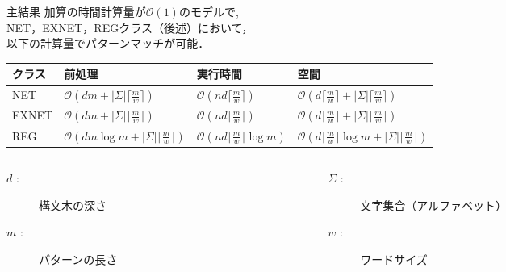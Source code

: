 \documentclass[dvipdfmx,12pt,beamer]{standalone}
\begin{document}
\begin{frame}{主結果}
  加算の時間計算量が$\mathcal{O}\left( 1 \right)$のモデルで, \\ 
  \textsf{NET}，\textsf{EXNET}，\textsf{REG}クラス（後述）において，\\以下の計算量でパターンマッチが可能．
  \begin{center}
    \scriptsize
    \begin{tabular}{|l|l|l|l|}\hline
      クラス & 前処理 & 実行時間 & 空間 \\\hline
      \textsf{NET} & $\mathcal{O}\left(dm + |\Sigma|\lceil \frac{m}{w} \rceil \right)$ & $\mathcal{O}\left(nd\lceil \frac{m}{w} \rceil \right)$ & $\mathcal{O}\left(d\lceil \frac{m}{w} \rceil + |\Sigma|\lceil \frac{m}{w} \rceil \right)$ \\\hline
      \textsf{EXNET} & $\mathcal{O}\left(dm + |\Sigma|\lceil \frac{m}{w} \rceil \right)$ & $\mathcal{O}\left(nd\lceil \frac{m}{w} \rceil \right)$ & $\mathcal{O}\left(d\lceil \frac{m}{w} \rceil + |\Sigma|\lceil \frac{m}{w} \rceil \right)$ \\\hline
      \textsf{REG} & $\mathcal{O}\left(dm\log m + |\Sigma|\lceil \frac{m}{w} \rceil \right)$ & $\mathcal{O}\left(nd\lceil \frac{m}{w} \rceil \log m \right)$ & $\mathcal{O}\left(d\lceil \frac{m}{w} \rceil \log m + |\Sigma|\lceil \frac{m}{w} \rceil \right)$ \\\hline
    \end{tabular}
  \end{center}
  \begin{columns}[t]
    \scriptsize
    \begin{column}{0.4\linewidth}
      \begin{description}
        \item[$d$ :] 構文木の深さ
        \item[$m$ :] パターンの長さ
      \end{description}
    \end{column}
    \begin{column}{0.59\linewidth}
      \begin{description}
        \item[$\Sigma$ :] 文字集合（アルファベット）
        \item[$w$ :] ワードサイズ
      \end{description}
    \end{column}
  \end{columns}
\end{frame}
\end{document}
